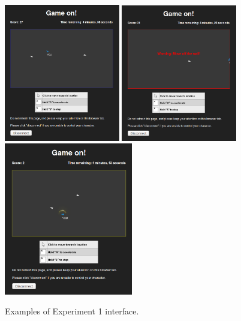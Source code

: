 \documentclass[12pt,letterpaper]{article}
\begin{document}
\begin{figure}
  \centering
  \includegraphics[width=0.45\textwidth]{./figures/experiment-3-no-score}
\includegraphics[width=0.45\textwidth]{./figures/experiment-3-wall}
  \includegraphics[width=0.5\textwidth]{./figures/experiment-3-score}
  \hspace{0.1cm}
  \caption{Examples of Experiment 1 interface.}
  \label{fig:supplemental_interface}
\end{figure}
\end{document}
